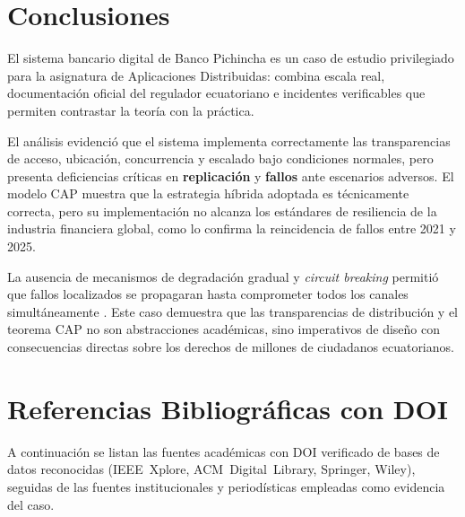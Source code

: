 \documentclass[12pt,a4paper]{article}
\begin{document}
\section{Conclusiones}

El sistema bancario digital de Banco Pichincha es un caso de estudio privilegiado para la asignatura de Aplicaciones Distribuidas: combina escala real, documentaci\'on oficial del regulador ecuatoriano e incidentes verificables que permiten contrastar la teor\'ia con la pr\'actica.

El an\'alisis evidenci\'o que el sistema implementa correctamente las transparencias de acceso, ubicaci\'on, concurrencia y escalado bajo condiciones normales, pero presenta deficiencias cr\'iticas en \textbf{replicaci\'on} y \textbf{fallos} ante escenarios adversos. El modelo CAP \cite{GilbertLynch2002} muestra que la estrategia h\'ibrida adoptada es t\'ecnicamente correcta, pero su implementaci\'on no alcanza los est\'andares de resiliencia de la industria financiera global, como lo confirma la reincidencia de fallos entre 2021 y 2025.

La ausencia de mecanismos de degradaci\'on gradual y \textit{circuit breaking} permiti\'o que fallos localizados se propagaran hasta comprometer todos los canales simult\'aneamente \cite{SuperbancosCanales2021, DefensoriaPueblo2021}. Este caso demuestra que las transparencias de distribuci\'on y el teorema CAP no son abstracciones acad\'emicas, sino imperativos de dise\~no con consecuencias directas sobre los derechos de millones de ciudadanos ecuatorianos.

\newpage


\newpage
\section*{Referencias Bibliogr\'aficas con DOI}

\noindent A continuaci\'on se listan las fuentes acad\'emicas con DOI verificado
de bases de datos reconocidas (IEEE~Xplore, ACM~Digital~Library, Springer,
Wiley), seguidas de las fuentes institucionales y period\'isticas empleadas
como evidencia del caso.
\end{document}
